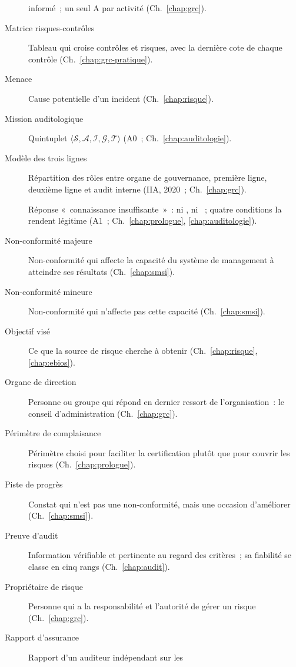 \begin{description}
          informé~; un seul A par activité (Ch.~\ref{chap:grc}).
    \item[Matrice risques-contrôles] Tableau qui croise contrôles et
          risques, avec la dernière cote de chaque contrôle
          (Ch.~\ref{chap:grc-pratique}).
    \item[Menace] Cause potentielle d'un incident (Ch.~\ref{chap:risque}).
    \item[Mission auditologique] Quintuplet $\langle \mathcal{S},
          \mathcal{A}, \mathcal{I}, \mathcal{G}, \mathcal{T} \rangle$ (A0~;
          Ch.~\ref{chap:auditologie}).
    \item[Modèle des trois lignes] Répartition des rôles entre organe de
          gouvernance, première ligne, deuxième ligne et audit interne (IIA,
          2020~; Ch.~\ref{chap:grc}).
    \item[\NEK{}] Réponse «~connaissance insuffisante~»~: ni \OUI{}, ni
          \NON{}~; quatre conditions la rendent légitime (A1~;
          Ch.~\ref{chap:prologue}, \ref{chap:auditologie}).
    \item[Non-conformité majeure] Non-conformité qui affecte la capacité du
          système de management à atteindre ses résultats
          (Ch.~\ref{chap:smsi}).
    \item[Non-conformité mineure] Non-conformité qui n'affecte pas cette
          capacité (Ch.~\ref{chap:smsi}).
    \item[Objectif visé] Ce que la source de risque cherche à obtenir
          (Ch.~\ref{chap:risque}, \ref{chap:ebios}).
    \item[Organe de direction] Personne ou groupe qui répond en dernier
          ressort de l'organisation~: le conseil d'administration
          (Ch.~\ref{chap:grc}).
    \item[Périmètre de complaisance] Périmètre choisi pour faciliter la
          certification plutôt que pour couvrir les risques
          (Ch.~\ref{chap:prologue}).
    \item[Piste de progrès] Constat qui n'est pas une non-conformité, mais
          une occasion d'améliorer (Ch.~\ref{chap:smsi}).
    \item[Preuve d'audit] Information vérifiable et pertinente au regard des
          critères~; sa fiabilité se classe en cinq rangs
          (Ch.~\ref{chap:audit}).
    \item[Propriétaire de risque] Personne qui a la responsabilité et
          l'autorité de gérer un risque (Ch.~\ref{chap:grc}).
    \item[Rapport d'assurance] Rapport d'un auditeur indépendant sur les

\end{description}
